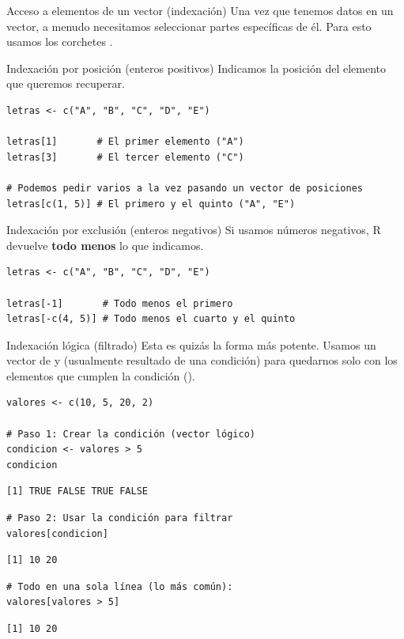 \documentclass[8pt]{beamer}
\begin{document}
\begin{frame}[fragile]{Acceso a elementos de un vector (indexación)}
	Una vez que tenemos datos en un vector, a menudo necesitamos seleccionar partes específicas de él. Para esto usamos los corchetes \rscript{[]}.
\end{frame}


\begin{frame}[fragile]{Indexación por posición (enteros positivos)}
	Indicamos la posición del elemento que queremos recuperar.
\begin{lstlisting}[style=RScript]
letras <- c("A", "B", "C", "D", "E")

letras[1]       # El primer elemento ("A")
letras[3]       # El tercer elemento ("C")

# Podemos pedir varios a la vez pasando un vector de posiciones
letras[c(1, 5)] # El primero y el quinto ("A", "E")
\end{lstlisting}
\end{frame}


\begin{frame}[fragile]{Indexación por exclusión (enteros negativos)}
	Si usamos números negativos, R devuelve \textbf{todo menos} lo que indicamos.
\begin{lstlisting}[style=RScript]
letras <- c("A", "B", "C", "D", "E")

letras[-1]       # Todo menos el primero
letras[-c(4, 5)] # Todo menos el cuarto y el quinto
\end{lstlisting}
\end{frame}



\begin{frame}[fragile]{Indexación lógica (filtrado)}
	Esta es quizás la forma más potente. Usamos un vector de  y  (usualmente resultado de una condición) para quedarnos solo con los elementos que cumplen la condición ().
\begin{lstlisting}[style=RScript]
valores <- c(10, 5, 20, 2)

# Paso 1: Crear la condición (vector lógico)
condicion <- valores > 5
condicion 
\end{lstlisting}
\begin{lstlisting}[style=RConsole]
[1] TRUE FALSE TRUE FALSE	
\end{lstlisting}
\begin{lstlisting}[style=RScript]
# Paso 2: Usar la condición para filtrar
valores[condicion]
\end{lstlisting}
\begin{lstlisting}[style=RConsole]
[1] 10 20
\end{lstlisting}
\begin{lstlisting}[style=RScript]
# Todo en una sola línea (lo más común):
valores[valores > 5]
\end{lstlisting}
\begin{lstlisting}[style=RConsole]
[1] 10 20	
\end{lstlisting}
\end{frame}
\end{document}
